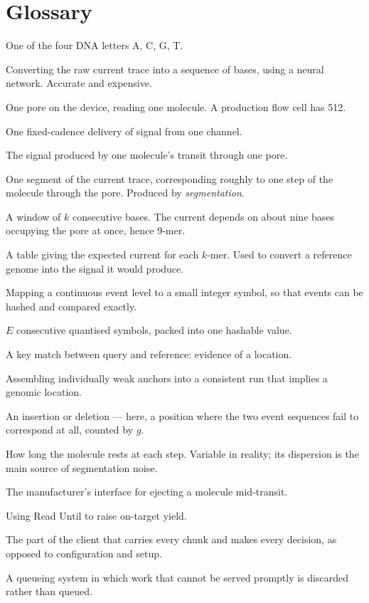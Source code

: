 \documentclass[11pt,a4paper]{article}
\begin{document}
\section*{Glossary}

\begin{description}[leftmargin=!, labelwidth=3.1cm, style=nextline, font=\normalfont\textbf]
\item[base] One of the four DNA letters A, C, G, T.
\item[basecalling] Converting the raw current trace into a sequence of bases, using a neural
network. Accurate and expensive.
\item[channel] One pore on the device, reading one molecule. A production flow cell has 512.
\item[chunk] One fixed-cadence delivery of signal from one channel.
\item[read] The signal produced by one molecule's transit through one pore.
\item[event] One segment of the current trace, corresponding roughly to one step of the
molecule through the pore. Produced by \emph{segmentation}.
\item[$k$-mer / 9-mer] A window of $k$ consecutive bases. The current depends on about nine
bases occupying the pore at once, hence 9-mer.
\item[pore model] A table giving the expected current for each $k$-mer. Used to convert a
reference genome into the signal it would produce.
\item[quantisation] Mapping a continuous event level to a small integer symbol, so that
events can be hashed and compared exactly.
\item[key] $E$ consecutive quantised symbols, packed into one hashable value.
\item[anchor] A key match between query and reference: evidence of a location.
\item[chaining] Assembling individually weak anchors into a consistent run that implies a
genomic location.
\item[indel] An insertion or deletion --- here, a position where the two event sequences fail
to correspond at all, counted by $g$.
\item[dwell] How long the molecule rests at each step. Variable in reality; its dispersion is
the main source of segmentation noise.
\item[Read Until] The manufacturer's interface for ejecting a molecule mid-transit.
\item[adaptive sampling] Using Read Until to raise on-target yield.
\item[data plane] The part of the client that carries every chunk and makes every decision,
as opposed to configuration and setup.
\item[loss system] A queueing system in which work that cannot be served promptly is
discarded rather than queued.
\end{description}
\end{document}
